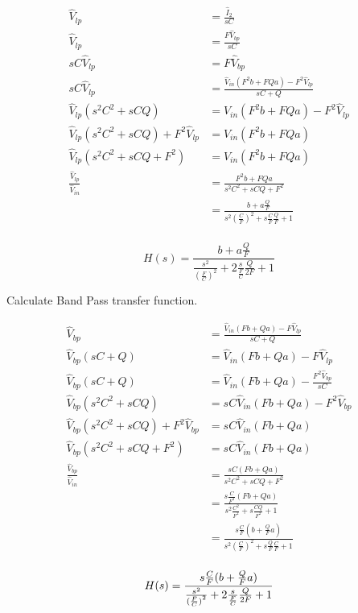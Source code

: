 \documentclass{article}
\begin{document}
\begin{equation*}
\begin{split}
  \hat{V}_{lp} & = \frac{\hat{I}_2}{sC} \\
  \hat{V}_{lp} & = \frac{F\hat{V}_{bp}}{sC} \\
  sC\hat{V}_{lp} & = F\hat{V}_{bp} \\
  sC\hat{V}_{lp} & = \frac{\hat{V}_{in}(F^2b + FQa) - F^2\hat{V}_{lp}}{sC + Q} \\
  \hat{V}_{lp}(s^2C^2 + sCQ) & = \hat{V}_{in}(F^2b + FQa) - F^2\hat{V}_{lp} \\
  \hat{V}_{lp}(s^2C^2 + sCQ) + F^2\hat{V}_{lp} & = \hat{V}_{in}(F^2b + FQa) \\
  \hat{V}_{lp}(s^2C^2 + sCQ + F^2) & = \hat{V}_{in}(F^2b + FQa) \\
  \frac{\hat{V}_{lp}}{\hat{V}_{in}} & = \frac{F^2b + FQa}{s^2C^2 + sCQ + F^2} \\
  & = \frac{b + a\frac{Q}{F}}{s^2{(\frac{C}{F})}^2 + s\frac{C}{F}\frac{Q}{F} + 1} \\
\end{split}
\end{equation*}

\begin{equation}
  H(s) = \frac{b + a\frac{Q}{F}}{\frac{s^2}{{(\frac{F}{C})}^2} + 2\frac{s}{\frac{F}{C}}\frac{Q}{2F} + 1}
\end{equation}

Calculate Band Pass transfer function.

\begin{equation*}
\begin{split}
  \hat{V}_{bp} & = \frac{\hat{V}_{in}(Fb + Qa) - F\hat{V}_{lp}}{sC + Q} \\
  \hat{V}_{bp}(sC + Q) & = \hat{V}_{in}(Fb + Qa) - F\hat{V}_{lp} \\
  \hat{V}_{bp}(sC + Q) & = \hat{V}_{in}(Fb + Qa) - \frac{F^2\hat{V}_{bp}}{sC} \\
  \hat{V}_{bp}(s^2C^2 + sCQ) & = sC\hat{V}_{in}(Fb + Qa) - F^2\hat{V}_{bp} \\
  \hat{V}_{bp}(s^2C^2 + sCQ) + F^2\hat{V}_{bp} & = sC\hat{V}_{in}(Fb + Qa) \\
  \hat{V}_{bp}(s^2C^2 + sCQ + F^2) & = sC\hat{V}_{in}(Fb + Qa) \\
  \frac{\hat{V}_{bp}}{\hat{V}_{in}} & = \frac{sC(Fb + Qa)}{s^2C^2 + sCQ + F^2} \\
  & = \frac{s\frac{C}{F^2}(Fb + Qa)}{s^2\frac{C^2}{F^2} + s\frac{CQ}{F^2} + 1} \\
  & = \frac{s\frac{C}{F}{(b + \frac{Q}{F}a)}}{s^2{(\frac{C}{F})}^2 + s\frac{Q}{F}\frac{C}{F} + 1} \\
\end{split}
\end{equation*}

\begin{equation}
  H(s) = \frac{s\frac{C}{F}{(b + \frac{Q}{F}a)}}{\frac{s^2}{{(\frac{F}{C})}^2} + 2\frac{s}{\frac{F}{C}}\frac{Q}{2F} + 1} \\
\end{equation}
\end{document}
